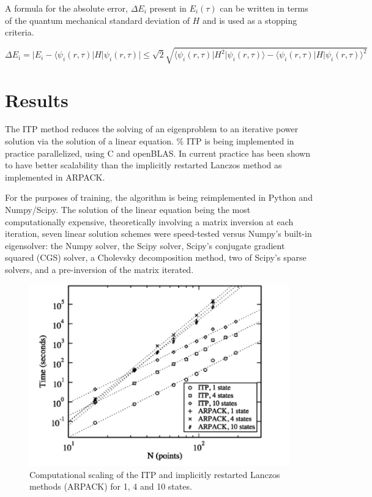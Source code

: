 \documentclass[12pt,]{book}
\begin{document}
A formula for the absolute error, \(\Delta E_i\) present in
\(E_i(\tau)\) can be written in terms of the quantum mechanical standard
deviation of \(H\) and is used as a stopping criteria.

\begin{equation}
\label{eq:error}
\Delta E_i = \rvert E_i -\langle\psi_i(r,\tau)\rvert H\rvert\psi_i(r,\tau)\rvert\leq\sqrt{2}\sqrt{\langle\psi_i(r,\tau)\rvert H^2\rvert\psi_i(r,\tau)\rangle-\langle\psi_i(r,\tau)\rvert H\rvert\psi_i(r,\tau)\rangle^2}
\end{equation}

\section*{Results}

The ITP method reduces the solving of an eigenproblem to an iterative
power solution via the solution of a linear equation. \% ITP is being
implemented in practice parallelized, using C and openBLAS. In current
practice has been shown to have better scalability than the implicitly
restarted Lanczos method as implemented in ARPACK.

For the purposes of training, the algorithm is being reimplemented in
Python and Numpy/Scipy. The solution of the linear equation being the
most computationally expensive, theoretically involving a matrix
inversion at each iteration, seven linear solution schemes were
speed-tested versus Numpy's built-in eigensolver: the Numpy solver, the
Scipy solver, Scipy's conjugate gradient squared (CGS) solver, a
Cholevsky decomposition method, two of Scipy's sparse solvers, and a
pre-inversion of the matrix iterated.

\begin{figure}[htbp]
\centering
\includegraphics{assets/graphics/itpvlanc.png}
\caption{Computational scaling of the ITP and implicitly restarted
Lanczos methods (ARPACK) for 1, 4 and 10 states.}
\end{figure}
\end{document}
